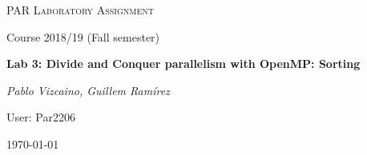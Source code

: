\makeatletter
\begin{titlepage}
\thispagestyle{empty}
\begin{center}
	\centering
	\vspace{1cm}
	{\scshape\Large PAR Laboratory Assignment\par}
	\vspace{0.75cm}
	{\Large Course 2018/19 (Fall semester)\par}
	\vspace{0.75cm}
	{\huge\bfseries Lab 3: Divide and Conquer parallelism with OpenMP: Sorting\par}
	\vspace{1cm}
	{\Large\itshape Pablo Vizcaino, Guillem Ramírez\par}
    \vspace{0.5cm}
    {\Large User: Par2206\par}
    \vfill
	{\large \today\par}
\end{center}
\clearpage
\end{titlepage}
